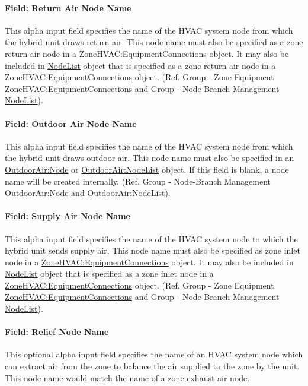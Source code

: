 \paragraph{Field: Return Air Node Name}
This alpha input field specifies the name of the HVAC system node from which the hybrid unit draws return air. This node name must also be specified as a zone return air node in a \hyperref[zonehvacequipmentconnections]{ZoneHVAC:EquipmentConnections} object. It may also be included in \hyperref[nodelist]{NodeList} object that is specified as a zone return air node in a \hyperref[zonehvacequipmentconnections]{ZoneHVAC:EquipmentConnections} object. (Ref. Group - Zone Equipment \hyperref[zonehvacequipmentconnections]{ZoneHVAC:EquipmentConnections} and Group - Node-Branch Management \hyperref[nodelist]{NodeList}).

\paragraph{Field: Outdoor Air Node Name}
This alpha input field specifies the name of the HVAC system node from which the hybrid unit draws outdoor air. This node name must also be specified in an \hyperref[outdoorairnode]{OutdoorAir:Node} or \hyperref[outdoorairnodelist]{OutdoorAir:NodeList} object. If this field is blank, a node name will be created internally. (Ref. Group - Node-Branch Management \hyperref[outdoorairnode]{OutdoorAir:Node} and \hyperref[outdoorairnodelist]{OutdoorAir:NodeList}).

\paragraph{Field: Supply Air Node Name}
This alpha input field specifies the name of the HVAC system node to which the hybrid unit sends supply air. This node name must also be specified as zone inlet node in a \hyperref[zonehvacequipmentconnections]{ZoneHVAC:EquipmentConnections} object. It may also be included in \hyperref[nodelist]{NodeList} object that is specified as a zone inlet node in a \hyperref[zonehvacequipmentconnections]{ZoneHVAC:EquipmentConnections} object. (Ref. Group - Zone Equipment \hyperref[zonehvacequipmentconnections]{ZoneHVAC:EquipmentConnections} and Group - Node-Branch Management \hyperref[nodelist]{NodeList}).

\paragraph{Field: Relief Node Name}
This optional alpha input field specifies the name of an HVAC system node which can extract air from the zone to balance the air supplied to the zone by the unit. This node name would match the name of a zone exhaust air node.

